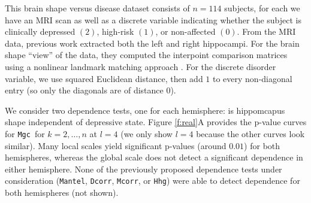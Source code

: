 \documentclass[11pt]{article}
\providecommand{\sct}[1]{{\sc \texttt{#1}}}
\newcommand{\Mgc}{\sct{Mgc}}
\newcommand{\Hhg}{\sct{Hhg}}
\newcommand{\Dcorr}{\sct{Dcorr}}
\newcommand{\Mcorr}{\sct{Mcorr}}
\newcommand{\Mantel}{\sct{Mantel}}
\begin{document}

This brain shape versus disease dataset consists of $n=114$ subjects, for each we have an MRI scan as well as a discrete variable indicating whether the subject is clinically depressed $(2)$, high-risk $(1)$, or non-affected $(0)$.  From the MRI data, previous work  extracted both the left and right hippocampi.   For the brain shape ``view'' of the data, they computed the interpoint comparison matrices using a nonlinear landmark matching approach \cite{ParkEtAl2008,BegEtAl2005}.
For the discrete disorder variable,
we use squared Euclidean distance, then add $1$ to every non-diagonal entry (so only the diagonals are of distance $0$). 

We consider two dependence tests, one for each hemisphere: is hippomcapus shape independent of depressive state.
Figure \ref{f:real}A provides the p-value curves for \Mgc~for $k=2,\ldots,n$ at $l=4$  (we only show $l=4$ because the other curves look similar). Many local scales yield significant p-values (around $0.01$) for both hemispheres, whereas the global scale does not detect a significant dependence in either hemisphere. None of the previously proposed dependence tests under consideration (\Mantel, \Dcorr, \Mcorr, or \Hhg) were able to detect dependence for both hemispheres (not shown).
\end{document}
